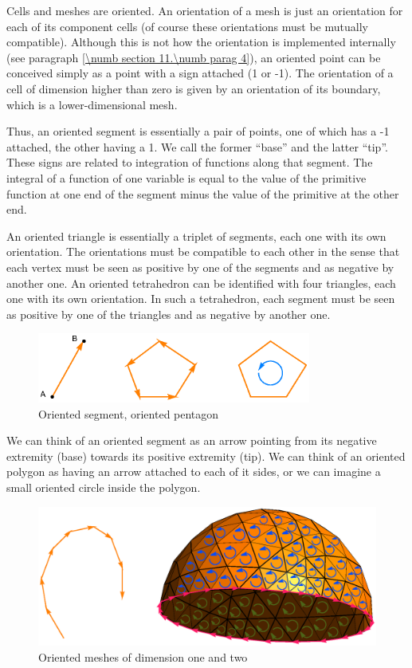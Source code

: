 Cells and meshes are oriented. 
An orientation of a mesh is just an orientation for each of its component cells
(of course these orientations must be mutually compatible).
Although this is not how the orientation is implemented internally
(see paragraph \ref{\numb section 11.\numb parag 4}),
an oriented point can be conceived simply as a point with a sign attached (1 or -1). 
The orientation of a cell of dimension higher than zero is given by an orientation
of its boundary, which is a lower-dimensional mesh.

Thus, an oriented segment is essentially a pair of points, one of which has a \hbox{-1}
attached, the other having a 1.
We call the former ``base'' and the latter ``tip''.
These signs are related to integration of functions along that segment.
The integral of a function of one variable is equal to the value of the 
primitive function at one end of the segment minus the value of the primitive at the other end.

An oriented triangle is essentially a triplet of segments, each one with its own orientation.
The orientations must be compatible to each other in the sense that each vertex 
must be seen as positive by one of the segments and as negative by another one.
An oriented tetrahedron can be identified with four triangles, each one with its own
orientation.
In such a tetrahedron, each segment must be seen as positive by one of the triangles and
as negative by another one.

\begin{figure}[ht] \centering
  \includegraphics[width=90mm]{oriented-cells.eps}
  \caption{Oriented segment, oriented pentagon}
  \label{\numb section 1.\numb fig 2}
\end{figure}

We can think of an oriented segment as an arrow pointing from its negative extremity (base)
towards its positive extremity (tip).
We can think of an oriented polygon as having an arrow attached to each of it sides,
or we can imagine a small oriented circle inside the polygon.

\begin{figure} \centering
  \includegraphics[width=115mm]{hemisphere-7}
  \caption{Oriented meshes of dimension one and two}
  \label{\numb section 1.\numb fig 3}
\end{figure}

